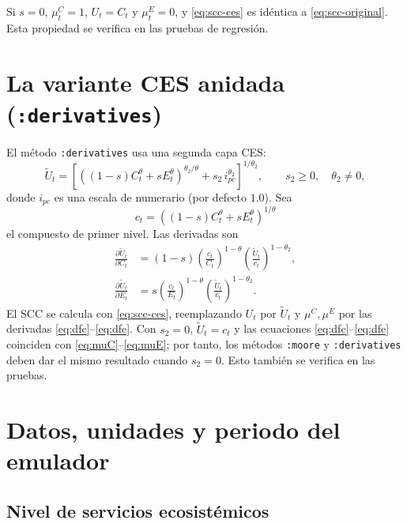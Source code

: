 \documentclass[11pt,a4paper]{article}
\begin{document}
Si \(s=0\), \(\mu^C_t=1\), \(U_t=C_t\) y \(\mu^E_t=0\), y
\eqref{eq:scc-ces} es idéntica a \eqref{eq:scc-original}. Esta propiedad se
verifica en las pruebas de regresión.

\section{La variante CES anidada (\texttt{:derivatives})}

El método \texttt{:derivatives} usa una segunda capa CES:
\begin{equation}
  \tilde U_t =
  \left[
    \left((1-s)C_t^{\theta} + sE_t^{\theta}\right)^{\theta_2/\theta}
    + s_2\,i_{pc}^{\theta_2}
  \right]^{1/\theta_2},
  \qquad s_2 \ge 0,\quad \theta_2 \neq 0,
  \label{eq:nested}
\end{equation}
donde \(i_{pc}\) es una escala de numerario (por defecto \(1.0\)). Sea
\begin{equation}
  c_t = \left((1-s)C_t^{\theta} + sE_t^{\theta}\right)^{1/\theta}
\end{equation}
el compuesto de primer nivel. Las derivadas son
\begin{align}
  \frac{\partial \tilde U_t}{\partial C_t}
  &= (1-s)\left(\frac{c_t}{C_t}\right)^{1-\theta}
     \left(\frac{\tilde U_t}{c_t}\right)^{1-\theta_2},
  \label{eq:dfc}\\
  \frac{\partial \tilde U_t}{\partial E_t}
  &= s\left(\frac{c_t}{E_t}\right)^{1-\theta}
     \left(\frac{\tilde U_t}{c_t}\right)^{1-\theta_2}.
  \label{eq:dfe}
\end{align}
El SCC se calcula con \eqref{eq:scc-ces}, reemplazando \(U_t\) por
\(\tilde U_t\) y \(\mu^C,\mu^E\) por las derivadas \eqref{eq:dfc}--\eqref{eq:dfe}.
Con \(s_2=0\), \(\tilde U_t=c_t\) y las ecuaciones \eqref{eq:dfc}--\eqref{eq:dfe}
coinciden con \eqref{eq:muC}--\eqref{eq:muE}; por tanto, los métodos
\texttt{:moore} y \texttt{:derivatives} deben dar el mismo resultado cuando
\(s_2=0\). Esto también se verifica en las pruebas.

\section{Datos, unidades y periodo del emulador}

\subsection{Nivel de servicios ecosistémicos}
\end{document}
